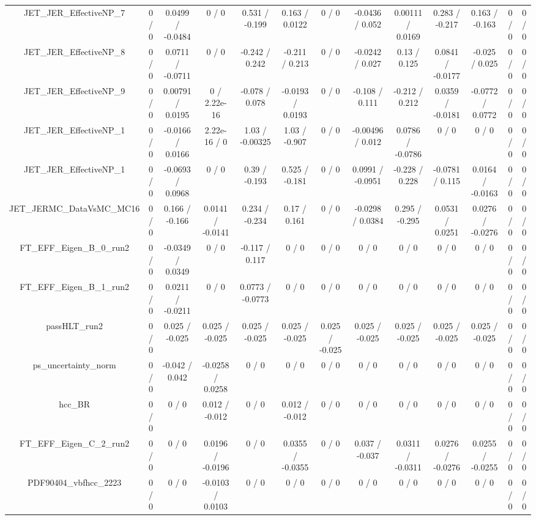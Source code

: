 \documentclass[10pt]{article}
\begin{document}
\begin{table}[htbp]
\begin{center}
\begin{tabular}{|c|c|c|c|c|c|c|c|c|c|c|c|c|}
  JET_JER_EffectiveNP_7 & 0 / 0 & 0.0499 / -0.0484 & 0 / 0 & 0.531 / -0.199 & 0.163 / 0.0122 & 0 / 0 & -0.0436 / 0.052 & 0.00111 / 0.0169 & 0.283 / -0.217 & 0.163 / -0.163 & 0 / 0 & 0 / 0 \\ 
  JET_JER_EffectiveNP_8 & 0 / 0 & 0.0711 / -0.0711 & 0 / 0 & -0.242 / 0.242 & -0.211 / 0.213 & 0 / 0 & -0.0242 / 0.027 & 0.13 / 0.125 & 0.0841 / -0.0177 & -0.025 / 0.025 & 0 / 0 & 0 / 0 \\ 
  JET_JER_EffectiveNP_9 & 0 / 0 & 0.00791 / 0.0195 & 0 / 2.22e-16 & -0.078 / 0.078 & -0.0193 / 0.0193 & 0 / 0 & -0.108 / 0.111 & -0.212 / 0.212 & 0.0359 / -0.0181 & -0.0772 / 0.0772 & 0 / 0 & 0 / 0 \\ 
  JET_JER_EffectiveNP_1 & 0 / 0 & -0.0166 / 0.0166 & 2.22e-16 / 0 & 1.03 / -0.00325 & 1.03 / -0.907 & 0 / 0 & -0.00496 / 0.012 & 0.0786 / -0.0786 & 0 / 0 & 0 / 0 & 0 / 0 & 0 / 0 \\ 
  JET_JER_EffectiveNP_1 & 0 / 0 & -0.0693 / 0.0968 & 0 / 0 & 0.39 / -0.193 & 0.525 / -0.181 & 0 / 0 & 0.0991 / -0.0951 & -0.228 / 0.228 & -0.0781 / 0.115 & 0.0164 / -0.0163 & 0 / 0 & 0 / 0 \\ 
  JET_JERMC_DataVsMC_MC16 & 0 / 0 & 0.166 / -0.166 & 0.0141 / -0.0141 & 0.234 / -0.234 & 0.17 / 0.161 & 0 / 0 & -0.0298 / 0.0384 & 0.295 / -0.295 & 0.0531 / 0.0251 & 0.0276 / -0.0276 & 0 / 0 & 0 / 0 \\ 
  FT_EFF_Eigen_B_0_run2 & 0 / 0 & -0.0349 / 0.0349 & 0 / 0 & -0.117 / 0.117 & 0 / 0 & 0 / 0 & 0 / 0 & 0 / 0 & 0 / 0 & 0 / 0 & 0 / 0 & 0 / 0 \\ 
  FT_EFF_Eigen_B_1_run2 & 0 / 0 & 0.0211 / -0.0211 & 0 / 0 & 0.0773 / -0.0773 & 0 / 0 & 0 / 0 & 0 / 0 & 0 / 0 & 0 / 0 & 0 / 0 & 0 / 0 & 0 / 0 \\ 
  passHLT_run2 & 0 / 0 & 0.025 / -0.025 & 0.025 / -0.025 & 0.025 / -0.025 & 0.025 / -0.025 & 0.025 / -0.025 & 0.025 / -0.025 & 0.025 / -0.025 & 0.025 / -0.025 & 0.025 / -0.025 & 0 / 0 & 0 / 0 \\ 
  ps_uncertainty_norm & 0 / 0 & -0.042 / 0.042 & -0.0258 / 0.0258 & 0 / 0 & 0 / 0 & 0 / 0 & 0 / 0 & 0 / 0 & 0 / 0 & 0 / 0 & 0 / 0 & 0 / 0 \\ 
  hcc_BR & 0 / 0 & 0 / 0 & 0.012 / -0.012 & 0 / 0 & 0.012 / -0.012 & 0 / 0 & 0 / 0 & 0 / 0 & 0 / 0 & 0 / 0 & 0 / 0 & 0 / 0 \\ 
  FT_EFF_Eigen_C_2_run2 & 0 / 0 & 0 / 0 & 0.0196 / -0.0196 & 0 / 0 & 0.0355 / -0.0355 & 0 / 0 & 0.037 / -0.037 & 0.0311 / -0.0311 & 0.0276 / -0.0276 & 0.0255 / -0.0255 & 0 / 0 & 0 / 0 \\ 
  PDF90404_vbfhcc_2223 & 0 / 0 & 0 / 0 & -0.0103 / 0.0103 & 0 / 0 & 0 / 0 & 0 / 0 & 0 / 0 & 0 / 0 & 0 / 0 & 0 / 0 & 0 / 0 & 0 / 0 \\ 

\end{tabular}
\end{center}
\end{table}
\end{document}
